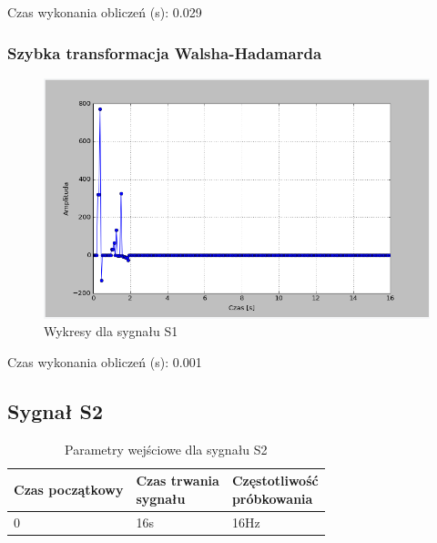 \documentclass{article}
\begin{document}
{                Czas wykonania obliczeń (s): 0.029 
            
            \subsubsection{Szybka transformacja Walsha-Hadamarda}

            
                \begin{figure}[h!]
                    \centering
                    \includegraphics[width=1\textwidth]{img/fwalshs1.png}
                    \caption{Wykresy dla sygnału S1}
                \end{figure}
                \FloatBarrier

                Czas wykonania obliczeń (s): 0.001  

    
    \subsection{Sygnał S2} 

        \begin{table}[h!]
            \centering
            \begin{tabular}{|l|l|l|}
                \hline
                Czas początkowy & \shortstack{Czas trwania \\ sygnału} & \shortstack{Częstotliwość\\ próbkowania}   \\ \hline
                0 & 16s & 16Hz         \\ \hline
            \end{tabular}
            \caption{Parametry wejściowe dla sygnału S2}
        \end{table}

}
\end{document}

